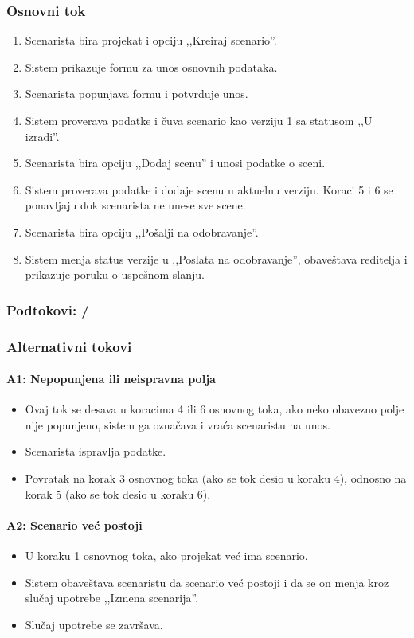\subsubsection*{Osnovni tok}
\begin{enumerate}
    \item Scenarista bira projekat i opciju ,,Kreiraj scenario''.
    \item Sistem prikazuje formu za unos osnovnih podataka.
    \item Scenarista popunjava formu i potvrđuje unos.
    \item Sistem proverava podatke i čuva scenario kao verziju 1 sa statusom ,,U izradi''.
    \item Scenarista bira opciju ,,Dodaj scenu'' i unosi podatke o sceni.
    \item Sistem proverava podatke i dodaje scenu u aktuelnu verziju. Koraci 5 i 6 se ponavljaju dok scenarista ne unese sve scene.
    \item Scenarista bira opciju ,,Pošalji na odobravanje''.
    \item Sistem menja status verzije u ,,Poslata na odobravanje'', obaveštava reditelja i prikazuje poruku o uspešnom slanju.
\end{enumerate}

\subsubsection*{Podtokovi: /}

\subsubsection*{Alternativni tokovi}

\paragraph*{A1: Nepopunjena ili neispravna polja}
\begin{itemize}
    \item Ovaj tok se desava u koracima 4 ili 6 osnovnog toka, ako neko obavezno polje nije popunjeno, sistem ga označava i vraća scenaristu na unos.
   \item Scenarista ispravlja podatke.
    \item Povratak na korak 3 osnovnog toka (ako se tok desio u koraku 4), odnosno na korak 5 (ako se tok desio u koraku 6).
\end{itemize}

\paragraph*{A2: Scenario već postoji}
\begin{itemize}
    \item U koraku 1 osnovnog toka, ako projekat već ima scenario. 
    \item Sistem obaveštava scenaristu da scenario već postoji i da se on menja kroz slučaj upotrebe ,,Izmena scenarija''.
    \item Slučaj upotrebe se završava.
\end{itemize}

